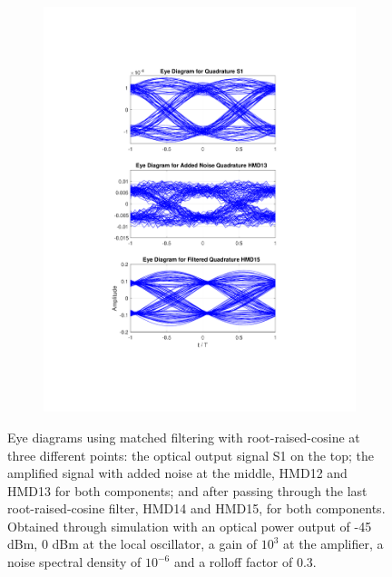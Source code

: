 \begin{figure}[H]
\begin{subfigure}{.45\textwidth}
		\includegraphics[clip, trim=5cm 4cm 5cm 4cm, width=\textwidth]{./sdf/m_qam_system/figures/eyes/q_p_45_03.pdf}
	\end{subfigure}
	
	\caption{Eye diagrams using matched filtering with root-raised-cosine at three different points: the optical output signal S1 on the top; the amplified signal with added noise at the middle, HMD12 and HMD13 for both components; and after passing through the last root-raised-cosine filter, HMD14 and HMD15, for both components. Obtained through simulation with an optical power output of -45 dBm, 0 dBm at the local oscillator, a gain of $10^3$ at the amplifier, a noise spectral density of $10^{-6}$ and a rolloff factor of 0.3.\label{fig:eyes_n_rrc_45_03}}
	
\end{figure}



